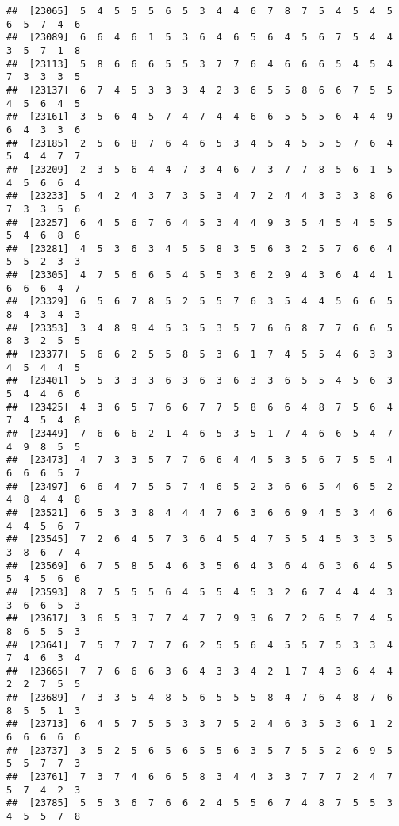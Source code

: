 \documentclass[
]{book}
\begin{document}
\begin{verbatim}
##  [23065]  5  4  5  5  5  6  5  3  4  4  6  7  8  7  5  4  5  4  5  6  5  7  4  6
##  [23089]  6  6  4  6  1  5  3  6  4  6  5  6  4  5  6  7  5  4  4  3  5  7  1  8
##  [23113]  5  8  6  6  6  5  5  3  7  7  6  4  6  6  6  5  4  5  4  7  3  3  3  5
##  [23137]  6  7  4  5  3  3  3  4  2  3  6  5  5  8  6  6  7  5  5  4  5  6  4  5
##  [23161]  3  5  6  4  5  7  4  7  4  4  6  6  5  5  5  6  4  4  9  6  4  3  3  6
##  [23185]  2  5  6  8  7  6  4  6  5  3  4  5  4  5  5  5  7  6  4  5  4  4  7  7
##  [23209]  2  3  5  6  4  4  7  3  4  6  7  3  7  7  8  5  6  1  5  4  5  6  6  4
##  [23233]  5  4  2  4  3  7  3  5  3  4  7  2  4  4  3  3  3  8  6  7  3  3  5  6
##  [23257]  6  4  5  6  7  6  4  5  3  4  4  9  3  5  4  5  4  5  5  5  4  6  8  6
##  [23281]  4  5  3  6  3  4  5  5  8  3  5  6  3  2  5  7  6  6  4  5  5  2  3  3
##  [23305]  4  7  5  6  6  5  4  5  5  3  6  2  9  4  3  6  4  4  1  6  6  6  4  7
##  [23329]  6  5  6  7  8  5  2  5  5  7  6  3  5  4  4  5  6  6  5  8  4  3  4  3
##  [23353]  3  4  8  9  4  5  3  5  3  5  7  6  6  8  7  7  6  6  5  8  3  2  5  5
##  [23377]  5  6  6  2  5  5  8  5  3  6  1  7  4  5  5  4  6  3  3  4  5  4  4  5
##  [23401]  5  5  3  3  3  6  3  6  3  6  3  3  6  5  5  4  5  6  3  5  4  4  6  6
##  [23425]  4  3  6  5  7  6  6  7  7  5  8  6  6  4  8  7  5  6  4  7  4  5  4  8
##  [23449]  7  6  6  6  2  1  4  6  5  3  5  1  7  4  6  6  5  4  7  4  9  8  5  5
##  [23473]  4  7  3  3  5  7  7  6  6  4  4  5  3  5  6  7  5  5  4  6  6  6  5  7
##  [23497]  6  6  4  7  5  5  7  4  6  5  2  3  6  6  5  4  6  5  2  4  8  4  4  8
##  [23521]  6  5  3  3  8  4  4  4  7  6  3  6  6  9  4  5  3  4  6  4  4  5  6  7
##  [23545]  7  2  6  4  5  7  3  6  4  5  4  7  5  5  4  5  3  3  5  3  8  6  7  4
##  [23569]  6  7  5  8  5  4  6  3  5  6  4  3  6  4  6  3  6  4  5  5  4  5  6  6
##  [23593]  8  7  5  5  5  6  4  5  5  4  5  3  2  6  7  4  4  4  3  3  6  6  5  3
##  [23617]  3  6  5  3  7  7  4  7  7  9  3  6  7  2  6  5  7  4  5  8  6  5  5  3
##  [23641]  7  5  7  7  7  7  6  2  5  5  6  4  5  5  7  5  3  3  4  7  4  6  3  4
##  [23665]  7  7  6  6  6  3  6  4  3  3  4  2  1  7  4  3  6  4  4  2  2  7  5  5
##  [23689]  7  3  3  5  4  8  5  6  5  5  5  8  4  7  6  4  8  7  6  8  5  5  1  3
##  [23713]  6  4  5  7  5  5  3  3  7  5  2  4  6  3  5  3  6  1  2  6  6  6  6  6
##  [23737]  3  5  2  5  6  5  6  5  5  6  3  5  7  5  5  2  6  9  5  5  5  7  7  3
##  [23761]  7  3  7  4  6  6  5  8  3  4  4  3  3  7  7  7  2  4  7  5  7  4  2  3
##  [23785]  5  5  3  6  7  6  6  2  4  5  5  6  7  4  8  7  5  5  3  4  5  5  7  8

\end{verbatim}
\end{document}
